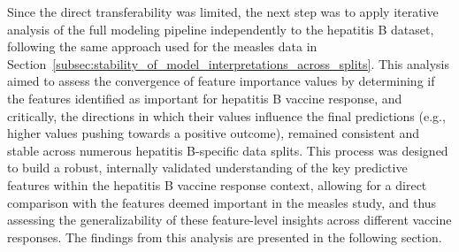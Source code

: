 \documentclass[12pt,a4paper]{report}
\begin{document}
\noindent
Since the direct transferability was limited, the next step was to apply iterative analysis of the full modeling pipeline independently to the hepatitis B dataset, following the same approach used for the measles data in Section~\ref{subsec:stability_of_model_interpretations_across_splits}. This analysis aimed to assess the convergence of feature importance values by determining if the features identified as important for hepatitis B vaccine response, and critically, the directions in which their values influence the final predictions (e.g., higher values pushing towards a positive outcome), remained consistent and stable across numerous hepatitis B-specific data splits. This process was designed to build a robust, internally validated understanding of the key predictive features within the hepatitis B vaccine response context, allowing for a direct comparison with the features deemed important in the measles study, and thus assessing the generalizability of these feature-level insights across different vaccine responses. The findings from this analysis are presented in the following section.
\pagebreak
\end{document}
